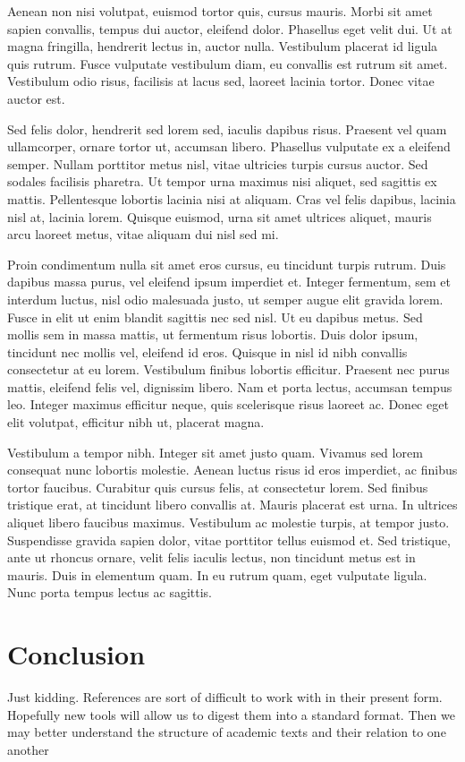 \documentclass[twocolumn,aps]{revtex4}
\begin{document}
Aenean non nisi volutpat, euismod tortor quis, cursus mauris. Morbi sit amet
sapien convallis, tempus dui auctor, eleifend dolor. Phasellus eget velit dui.
Ut at magna fringilla, hendrerit lectus in, auctor nulla. Vestibulum placerat
id ligula quis rutrum. Fusce vulputate vestibulum diam, eu convallis est rutrum
sit amet. Vestibulum odio risus, facilisis at lacus sed, laoreet lacinia
tortor. Donec vitae auctor est.

Sed felis dolor, hendrerit sed lorem sed, iaculis dapibus risus. Praesent vel
quam ullamcorper, ornare tortor ut, accumsan libero. Phasellus vulputate ex a
eleifend semper. Nullam porttitor metus nisl, vitae ultricies turpis cursus
auctor. Sed sodales facilisis pharetra. Ut tempor urna maximus nisi aliquet,
sed sagittis ex mattis. Pellentesque lobortis lacinia nisi at aliquam. Cras vel
felis dapibus, lacinia nisl at, lacinia lorem. Quisque euismod, urna sit amet
ultrices aliquet, mauris arcu laoreet metus, vitae aliquam dui nisl sed mi.

Proin condimentum nulla sit amet eros cursus, eu tincidunt turpis rutrum. Duis
dapibus massa purus, vel eleifend ipsum imperdiet et. Integer fermentum, sem et
interdum luctus, nisl odio malesuada justo, ut semper augue elit gravida lorem.
Fusce in elit ut enim blandit sagittis nec sed nisl. Ut eu dapibus metus. Sed
mollis sem in massa mattis, ut fermentum risus lobortis. Duis dolor ipsum,
tincidunt nec mollis vel, eleifend id eros. Quisque in nisl id nibh convallis
consectetur at eu lorem. Vestibulum finibus lobortis efficitur. Praesent nec
purus mattis, eleifend felis vel, dignissim libero. Nam et porta lectus,
accumsan tempus leo. Integer maximus efficitur neque, quis scelerisque risus
laoreet ac. Donec eget elit volutpat, efficitur nibh ut, placerat magna.

Vestibulum a tempor nibh. Integer sit amet justo quam. Vivamus sed lorem
consequat nunc lobortis molestie. Aenean luctus risus id eros imperdiet, ac
finibus tortor faucibus. Curabitur quis cursus felis, at consectetur lorem. Sed
finibus tristique erat, at tincidunt libero convallis at. Mauris placerat est
urna. In ultrices aliquet libero faucibus maximus. Vestibulum ac molestie
turpis, at tempor justo. Suspendisse gravida sapien dolor, vitae porttitor
tellus euismod et. Sed tristique, ante ut rhoncus ornare, velit felis iaculis
lectus, non tincidunt metus est in mauris. Duis in elementum quam. In eu rutrum
quam, eget vulputate ligula. Nunc porta tempus lectus ac sagittis.

\section{Conclusion}

Just kidding. References are sort of difficult to work with in their present
form.  Hopefully new tools will allow us to digest them into a standard format.
Then we may better understand the structure of academic texts and their
relation to one another~\cite{kajikawa2007creating, hummon1989connectivity,
nerur2005assessing}


\end{document}
